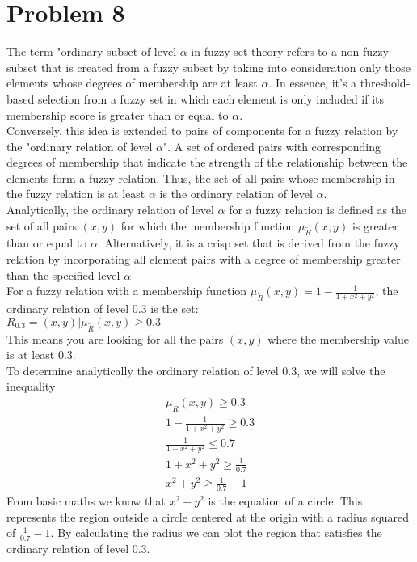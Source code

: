 \section{Problem 8}
The term "ordinary subset of level $\alpha$ in fuzzy set theory refers to a non-fuzzy subset that is created from a fuzzy subset by taking into consideration only those elements whose degrees of membership are at least $\alpha$. In essence, it's a threshold-based selection from a fuzzy set in which each element is only included if its membership score is greater than or equal to $\alpha$.\\
Conversely, this idea is extended to pairs of components for a fuzzy relation by the "ordinary relation of level $\alpha$". A set of ordered pairs with corresponding degrees of membership that indicate the strength of the relationship between the elements form a fuzzy relation. Thus, the set of all pairs whose membership in the fuzzy relation is at least $\alpha$ is the ordinary relation of level $\alpha$. \\

Analytically, the ordinary relation of level $\alpha$ for a fuzzy relation is defined as the set of all pairs $(x,y)$ for which the membership function $\mu_{\tilde{R}}(x,y)$ is greater than or equal to $\alpha$. Alternatively, it is a crisp set that is derived from the fuzzy relation by incorporating all element pairs with a degree of membership greater than the specified level $\alpha$\\

For a fuzzy relation with a membership function $\mu_{\tilde{R}}(x,y) = 1 - \frac{1}{1+x^2+y^2}$, the ordinary relation of level $0.3$ is the set:\\
$R_{0.3} = {(x,y) | \mu_{\tilde{R}}(x,y) \geq 0.3}$\\
This means you are looking for all the pairs $(x,y)$ where the membership value is at least $0.3$.\\

To determine analytically the ordinary relation of level $0.3$, we will solve the inequality
\begin{align*}
	\mu_{\tilde{R}}(x,y) \geq 0.3 \\
	1 - \frac{1}{1+x^2+y^2} \geq 0.3 \\
	\frac{1}{1+x^2+y^2} \leq 0.7 \\
	1 + x^2 + y^2 \geq \frac{1}{0.7} \\
	x^2 + y^2 \geq \frac{1}{0.7} - 1
\end{align*}
From basic maths we know that $	x^2 + y^2$ is the equation of a circle. This represents the region outside a circle centered at the origin with a radius squared of $\frac{1}{0.7} - 1$. By calculating the radius we can plot the region that satisfies the ordinary relation of level 0.3.